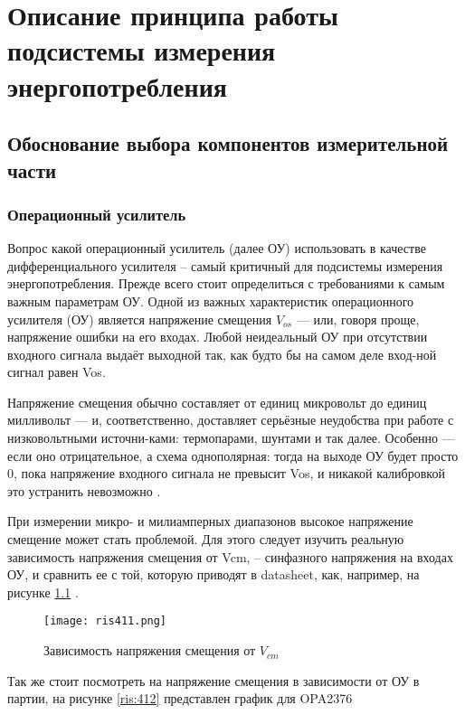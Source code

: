 \chapter{Описание принципа работы подсистемы измерения энергопотребления}
\section{Обоснование выбора компонентов измерительной части}
\subsection{Операционный усилитель}
\hspace{1cm} 

Вопрос какой операционный усилитель (далее ОУ) использовать в качестве дифференциального усилителя -- самый 
критичный для подсистемы измерения энергопотребления. Прежде всего стоит определиться с требованиями к 
самым важным параметрам ОУ. 
Одной из важных характеристик операционного усилителя (ОУ) является напряжение смещения $V_{os}$ — или, 
говоря проще, напряжение ошибки на его входах. Любой неидеальный ОУ при отсутствии входного сигнала выдаёт 
выходной так, как будто бы на самом деле вход-ной сигнал равен Vos.

Напряжение смещения обычно составляет от единиц микровольт до единиц милливольт — и, соответственно, 
доставляет серьёзные неудобства при работе с низковольтными источни-ками: термопарами, шунтами и так далее.
Особенно — если оно отрицательное, а схема однополярная: тогда на выходе ОУ будет просто 0, пока 
напряжение входного сигнала не превысит Vos, и никакой калибровкой это устранить невозможно \cite{Chopper:OU} 
\cite{MT-037:Tutorial}. 

При измерении микро- и милиамперных диапазонов высокое напряжение смещение может стать проблемой.
Для этого следует изучить реальную зависимость напряжения смещения от Vcm, -- синфазного
напряжения на входах ОУ, и сравнить ее с той, 
которую приводят в datasheet, как, например, на рисунке \ref{ris:411} \cite{OPAx376:datasheet}.
\begin{figure}[H]
\centering
\texttt{[image: ris411.png]}
\caption{Зависимость напряжения смещения от $V_{cm}$}
\label{ris:411}
\end{figure}

Так же стоит посмотреть на напряжение смещения в зависимости от ОУ в партии, 
на рисунке \ref{ris:412} представлен график для OPA2376 \cite{OPAx376:datasheet}

